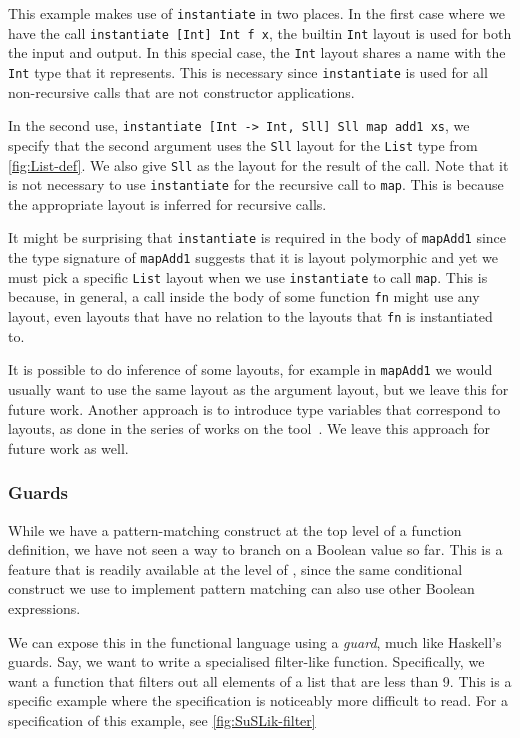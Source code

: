 This example makes use of \lstinline{instantiate} in two places. In the first case where we have the call
\lstinline{instantiate [Int] Int f x}, the builtin \verb|Int| layout is used for both the input
and output. In this special case, the \verb|Int| layout shares a name with the \verb|Int| type
that it represents. This is necessary since \lstinline{instantiate} is used for all non-recursive calls that are not constructor applications.

In the second use, \lstinline{instantiate [Int -> Int, Sll] Sll map add1 xs}, we specify that
the second argument uses the \verb|Sll| layout for the \verb|List| type from \autoref{fig:List-def}. We also give \verb|Sll| as
the layout for the result of the call. Note that it is not necessary to use \verb|instantiate| for the recursive call to \verb|map|. This is because the appropriate layout
is inferred for recursive calls.

It might be surprising that \verb|instantiate| is required in the body of \verb|mapAdd1| since the type signature
of \verb|mapAdd1| suggests that it is layout polymorphic and yet we must pick a specific \verb|List| layout when
we use \verb|instantiate| to call \verb|map|. This is because, in general, a call inside the body of some function \verb|fn| might use
any layout, even layouts that have no relation to the layouts that \verb|fn| is instantiated to.

It is possible to do inference of some layouts, for example in
\verb|mapAdd1| we would usually want to use the same layout as the
argument layout, but we leave this for future work. Another approach
is to introduce type variables that correspond to layouts, as done in
the series of works on the 
tool~\cite{chen:2023:dargent}.
%
We leave this approach for future work as well.

\subsubsection{Guards}

While we have a pattern-matching construct at the top level of a function definition, we
have not seen a way to branch on a Boolean value so far. This is a feature that is
readily available at the level of \SuSLik, since the same conditional construct we
use to implement pattern matching can also use other Boolean expressions.

We can expose this in the functional language using a \textit{guard},
much like Haskell's guards. Say, we want to write a specialised
filter-like function. Specifically, we want a function that filters
out all elements of a list that are less than 9. This is a specific
example where the \SuSLik{} specification is noticeably more difficult
to read. For a \SuSLik{} specification of this example, see
\autoref{fig:SuSLik-filter}

